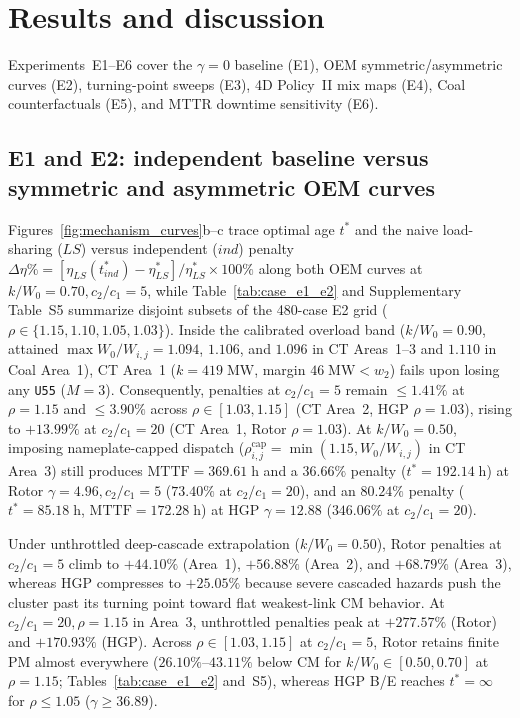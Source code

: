 \documentclass{elektr}
\begin{document}
\section{Results and discussion}
\label{sec:results}

Experiments~E1--E6 cover the $\gamma = 0$ baseline (E1), OEM symmetric/asymmetric curves (E2), turning-point sweeps (E3), 4D Policy~II mix maps (E4), Coal counterfactuals (E5), and MTTR downtime sensitivity (E6).

\subsection{E1 and E2: independent baseline versus symmetric and asymmetric OEM curves}
\label{sec:e1_e2}

Figures~\ref{fig:mechanism_curves}b--c trace optimal age $t^*$ and the naive load-sharing ($LS$) versus independent ($ind$) penalty $\Delta\eta\% = [\eta_{LS}(t_{ind}^*) - \eta_{LS}^*]/\eta_{LS}^* \times 100\%$ along both OEM curves at $k/W_0 = 0.70, c_2/c_1 = 5$, while Table~\ref{tab:case_e1_e2} and Supplementary Table~S5 summarize disjoint subsets of the 480-case E2 grid ($\rho \in \{1.15, 1.10, 1.05, 1.03\}$). Inside the calibrated overload band ($k/W_0 = 0.90$, attained $\max W_0/W_{i,j} = 1.094$, $1.106$, and $1.096$ in CT Areas~1--3 and $1.110$ in Coal Area~1), CT Area~1 ($k = 419\;\text{MW}$, margin $46\;\text{MW} < w_2$) fails upon losing any \texttt{U55} ($M = 3$). Consequently, penalties at $c_2/c_1 = 5$ remain $\le 1.41\%$ at $\rho = 1.15$ and $\le 3.90\%$ across $\rho \in [1.03, 1.15]$ (CT Area~2, HGP $\rho = 1.03$), rising to $+13.99\%$ at $c_2/c_1 = 20$ (CT Area~1, Rotor $\rho = 1.03$). At $k/W_0 = 0.50$, imposing nameplate-capped dispatch ($\rho_{i,j}^{\mathrm{cap}} = \min(1.15, W_0/W_{i,j})$ in CT Area~3) still produces $\mathrm{MTTF} = 369.61\;\text{h}$ and a $36.66\%$ penalty ($t^* = 192.14\;\text{h}$) at Rotor $\gamma = 4.96, c_2/c_1 = 5$ ($73.40\%$ at $c_2/c_1 = 20$), and an $80.24\%$ penalty ($t^* = 85.18\;\text{h}$, $\mathrm{MTTF} = 172.28\;\text{h}$) at HGP $\gamma = 12.88$ ($346.06\%$ at $c_2/c_1 = 20$).

Under unthrottled deep-cascade extrapolation ($k/W_0 = 0.50$), Rotor penalties at $c_2/c_1 = 5$ climb to $+44.10\%$ (Area~1), $+56.88\%$ (Area~2), and $+68.79\%$ (Area~3), whereas HGP compresses to $+25.05\%$ because severe cascaded hazards push the cluster past its turning point toward flat weakest-link CM behavior. At $c_2/c_1 = 20, \rho = 1.15$ in Area~3, unthrottled penalties peak at $+277.57\%$ (Rotor) and $+170.93\%$ (HGP). Across $\rho \in [1.03, 1.15]$ at $c_2/c_1 = 5$, Rotor retains finite PM almost everywhere ($26.10\%$--$43.11\%$ below CM for $k/W_0 \in [0.50, 0.70]$ at $\rho = 1.15$; Tables~\ref{tab:case_e1_e2} and~S5), whereas HGP B/E reaches $t^* = \infty$ for $\rho \le 1.05$ ($\gamma \ge 36.89$).
\end{document}
